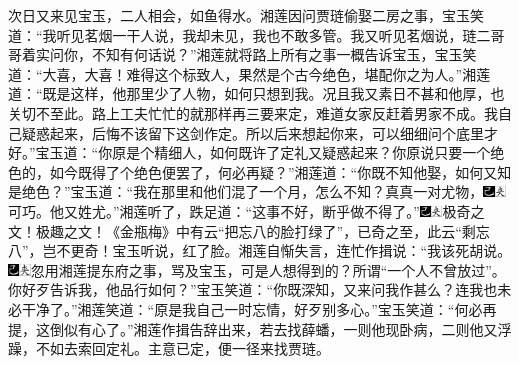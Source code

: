 次日又来见宝玉，二人相会，如鱼得水。湘莲因问贾琏偷娶二房之事，宝玉笑道：``我听见茗烟一干人说，我却未见，我也不敢多管。我又听见茗烟说，琏二哥哥着实问你，不知有何话说？''湘莲就将路上所有之事一概告诉宝玉，宝玉笑道：``大喜，大喜！难得这个标致人，果然是个古今绝色，堪配你之为人。''湘莲道：``既是这样，他那里少了人物，如何只想到我。况且我又素日不甚和他厚，也关切不至此。路上工夫忙忙的就那样再三要来定，难道女家反赶着男家不成。我自己疑惑起来，后悔不该留下这剑作定。所以后来想起你来，可以细细问个底里才好。''宝玉道：``你原是个精细人，如何既许了定礼又疑惑起来？你原说只要一个绝色的，如今既得了个绝色便罢了，何必再疑？''湘莲道：``你既不知他娶，如何又知是绝色？''宝玉道：``我在那里和他们混了一个月，怎么不知？真真一对尤物，{\includegraphics[width=3mm]{../Images/00003}\includegraphics[width=3mm]{../Images/00012}\footnotesize \kaishu 可巧。}他又姓尤。''湘莲听了，跌足道：``这事不好，断乎做不得了。''{\includegraphics[width=3mm]{../Images/00003}\includegraphics[width=3mm]{../Images/00012}\footnotesize \kaishu 极奇之文！极趣之文！《金瓶梅》中有云``把忘八的脸打绿了''，已奇之至，此云``剩忘八''，岂不更奇！}宝玉听说，红了脸。湘莲自惭失言，连忙作揖说：``我该死胡说。{\includegraphics[width=3mm]{../Images/00003}\includegraphics[width=3mm]{../Images/00012}\footnotesize \kaishu 忽用湘莲提东府之事，骂及宝玉，可是人想得到的？所谓``一个人不曾放过''。}你好歹告诉我，他品行如何？''宝玉笑道：``你既深知，又来问我作甚么？连我也未必干净了。''湘莲笑道：``原是我自己一时忘情，好歹别多心。''宝玉笑道：``何必再提，这倒似有心了。''湘莲作揖告辞出来，若去找薛蟠，一则他现卧病，二则他又浮躁，不如去索回定礼。主意已定，便一径来找贾琏。

